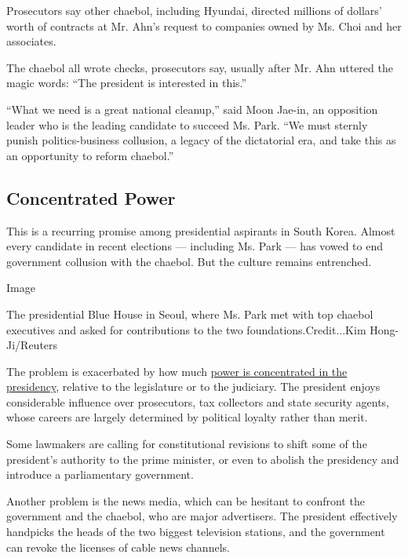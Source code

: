 Prosecutors say other chaebol, including Hyundai, directed millions of
dollars' worth of contracts at Mr. Ahn's request to companies owned by
Ms. Choi and her associates.

The chaebol all wrote checks, prosecutors say, usually after Mr. Ahn
uttered the magic words: ``The president is interested in this.''

``What we need is a great national cleanup,'' said Moon Jae-in, an
opposition leader who is the leading candidate to succeed Ms. Park. ``We
must sternly punish politics-business collusion, a legacy of the
dictatorial era, and take this as an opportunity to reform chaebol.''

\hypertarget{concentrated-power}{%
\subsection{Concentrated Power}\label{concentrated-power}}

This is a recurring promise among presidential aspirants in South Korea.
Almost every candidate in recent elections --- including Ms. Park ---
has vowed to end government collusion with the chaebol. But the culture
remains entrenched.

Image

The presidential Blue House in Seoul, where Ms. Park met with top
chaebol executives and asked for contributions to the two
foundations.Credit...Kim Hong-Ji/Reuters

The problem is exacerbated by how much
\href{https://www.nytimes3xbfgragh.onion/2016/11/12/world/asia/south-korea-park-geun-hye.html?rref=collection\%2Ftimestopic\%2FPark\%20Geun-hye\&action=click\&contentCollection=timestopics\&region=stream\&module=stream_unit\&version=latest\&contentPlacement=54\&pgtype=collection}{power
is concentrated in the presidency}, relative to the legislature or to
the judiciary. The president enjoys considerable influence over
prosecutors, tax collectors and state security agents, whose careers are
largely determined by political loyalty rather than merit.

Some lawmakers are calling for constitutional revisions to shift some of
the president's authority to the prime minister, or even to abolish the
presidency and introduce a parliamentary government.

Another problem is the news media, which can be hesitant to confront the
government and the chaebol, who are major advertisers. The president
effectively handpicks the heads of the two biggest television stations,
and the government can revoke the licenses of cable news channels.


